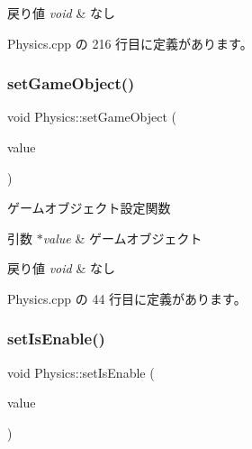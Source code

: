 \begin{DoxyRetVals}{戻り値}
{\em void} & なし \\
\hline
\end{DoxyRetVals}


 Physics.\+cpp の 216 行目に定義があります。

\mbox{\label{class_physics_a8362e2d029415bc93b25b0891cc8a3d8}} 
\subsubsection{\texorpdfstring{set\+Game\+Object()}{setGameObject()}}
{\footnotesize\ttfamily void Physics\+::set\+Game\+Object (\begin{DoxyParamCaption}\item[{\mbox{\hyperlink{class_game_object_base}{Game\+Object\+Base}} $\ast$}]{value }\end{DoxyParamCaption})}



ゲームオブジェクト設定関数 


\begin{DoxyParams}{引数}
{\em $\ast$value} & ゲームオブジェクト \\
\hline
\end{DoxyParams}

\begin{DoxyRetVals}{戻り値}
{\em void} & なし \\
\hline
\end{DoxyRetVals}


 Physics.\+cpp の 44 行目に定義があります。

\mbox{\label{class_physics_a7ae1ceeab958b0a86cb7e570e5e405b5}} 
\subsubsection{\texorpdfstring{set\+Is\+Enable()}{setIsEnable()}}
{\footnotesize\ttfamily void Physics\+::set\+Is\+Enable (\begin{DoxyParamCaption}\item[{bool}]{value }\end{DoxyParamCaption})}



